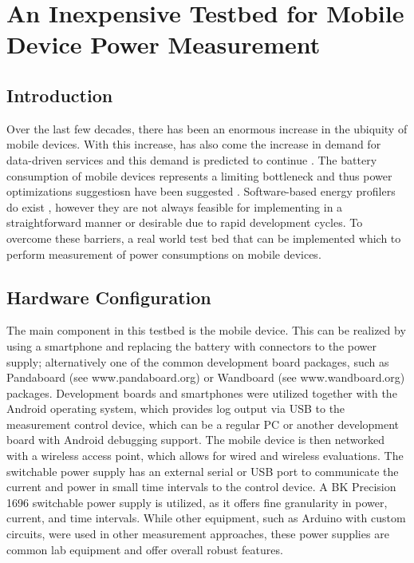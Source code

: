 \chapter{An Inexpensive Testbed for Mobile Device Power Measurement} 
\label{ch:testbed}


\section*{Introduction}

Over the last few decades, there has been an enormous increase in the ubiquity of mobile devices. With this increase, has also come the increase in demand for data-driven services and this demand is predicted to continue \cite{VNI14}. The battery consumption of mobile devices represents a limiting bottleneck and thus  power optimizations suggestiosn have been suggested \cite{Qian:2012:PTM:2187836.2187844}. Software-based energy profilers do exist \cite{DAmato:2011:EAE:2419622.2419929}, however they are not always feasible for implementing in a straightforward manner or desirable due to rapid development cycles. To overcome these barriers, a real world test bed that can be implemented which to perform measurement of power consumptions on mobile devices.

\section*{Hardware Configuration}

The main component in this testbed is the mobile device.
This can be realized by using a smartphone and replacing the
battery with connectors to the power supply; alternatively one
of the common development board packages, such as
Pandaboard (see www.pandaboard.org) or Wandboard (see
www.wandboard.org) packages. Development boards and smartphones were utilized together with the
Android operating system, which provides log output via USB
to the measurement control device, which can be a regular PC
or another development board with Android debugging
support. The mobile device is then networked with a wireless access point, which allows for wired and wireless evaluations.
The switchable power supply has an external serial or USB
port to communicate the current and power in small time
intervals to the control device. A BK Precision
1696 switchable power supply is utilized, as it offers fine granularity in power, current, and time intervals. While other equipment, such as Arduino with custom circuits, were used in other measurement approaches, these power supplies are common lab equipment and offer overall robust features.

